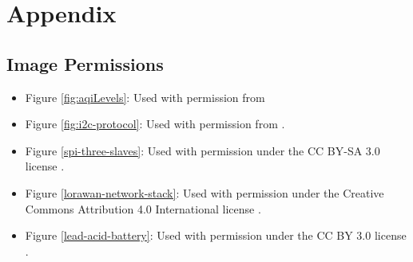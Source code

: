 \section{Appendix}
\subsection{Image Permissions}


\begin{itemize}
\item Figure \ref{fig:aqiLevels}: Used with permission from


\item Figure \ref{fig:i2c-protocol}: Used with permission from \cite{i2c-protocol}.

\item Figure \ref{spi-three-slaves}: Used with permission under the CC BY-SA 3.0 license \cite{spi-image}.

\item Figure \ref{lorawan-network-stack}: Used with permission under the Creative Commons Attribution 4.0 International license \cite{lorawan-network-stack}.

\item Figure \ref{lead-acid-battery}: Used with permission under the CC BY 3.0 license \cite{Lead-Acid-Charging}.


\end{itemize}
